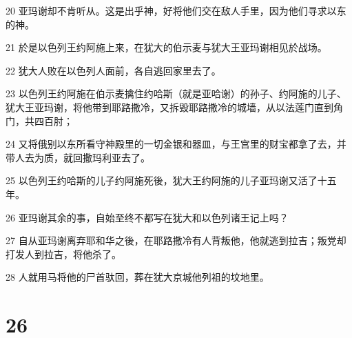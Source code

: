 \par 20 亚玛谢却不肯听从。这是出乎神，好将他们交在敌人手里，因为他们寻求以东的神。
\par 21 於是以色列王约阿施上来，在犹大的伯示麦与犹大王亚玛谢相见於战场。
\par 22 犹大人败在以色列人面前，各自逃回家里去了。
\par 23 以色列王约阿施在伯示麦擒住约哈斯（就是亚哈谢）的孙子、约阿施的儿子、犹大王亚玛谢，将他带到耶路撒冷，又拆毁耶路撒冷的城墙，从以法莲门直到角门，共四百肘；
\par 24 又将俄别以东所看守神殿里的一切金银和器皿，与王宫里的财宝都拿了去，并带人去为质，就回撒玛利亚去了。
\par 25 以色列王约哈斯的儿子约阿施死後，犹大王约阿施的儿子亚玛谢又活了十五年。
\par 26 亚玛谢其余的事，自始至终不都写在犹大和以色列诸王记上吗？
\par 27 自从亚玛谢离弃耶和华之後，在耶路撒冷有人背叛他，他就逃到拉吉；叛党却打发人到拉吉，将他杀了。
\par 28 人就用马将他的尸首驮回，葬在犹大京城他列祖的坟地里。

\chapter{26}

